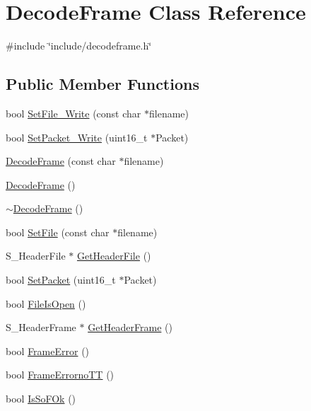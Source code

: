 \hypertarget{classDecodeFrame}{}\section{Decode\+Frame Class Reference}
\label{classDecodeFrame}


{\ttfamily \#include \char`\"{}include/decodeframe.\+h\char`\"{}}

\subsection*{Public Member Functions}
\begin{DoxyCompactItemize}
\item 
bool \hyperlink{classDecodeFrame_abe7a0f6d2223aa6a06da02745f2f624b}{Set\+File\+\_\+\+Write} (const char $\ast$filename)
\item 
bool \hyperlink{classDecodeFrame_a82966f11399d4b9987c0718d9c2713b4}{Set\+Packet\+\_\+\+Write} (uint16\+\_\+t $\ast$Packet)
\item 
\hyperlink{classDecodeFrame_ad55f7834381bfcdbe5796d11febfe3f0}{Decode\+Frame} (const char $\ast$filename)
\item 
\hyperlink{classDecodeFrame_ae6ae88ee29bcaff936e7c7b2380f96b4}{Decode\+Frame} ()
\item 
\hyperlink{classDecodeFrame_a150abde40a177b9b585c75d562516f2a}{$\sim$\+Decode\+Frame} ()
\item 
bool \hyperlink{classDecodeFrame_a61d74f8bd0886b27356a4431999049ae}{Set\+File} (const char $\ast$filename)
\item 
S\+\_\+\+Header\+File $\ast$ \hyperlink{classDecodeFrame_ad8de43342e31a5e31c2a8c57c576546f}{Get\+Header\+File} ()
\item 
bool \hyperlink{classDecodeFrame_a84aaba0024f0e2c959c83db47a4e6cd1}{Set\+Packet} (uint16\+\_\+t $\ast$Packet)
\item 
bool \hyperlink{classDecodeFrame_a5d8e060fc486a29d456973255c88e876}{File\+Is\+Open} ()
\item 
S\+\_\+\+Header\+Frame $\ast$ \hyperlink{classDecodeFrame_a0c3e4dd83dc4b935589628a17b0de765}{Get\+Header\+Frame} ()
\item 
bool \hyperlink{classDecodeFrame_a177c97af4a097447759fdbd28ef8d18a}{Frame\+Error} ()
\item 
bool \hyperlink{classDecodeFrame_a4c5721b8abf506ea36ceba56d07d930b}{Frame\+Errorno\+TT} ()
\item 
bool \hyperlink{classDecodeFrame_af2b5f1f869480dd72404b2fc3f1bac80}{Is\+So\+F\+Ok} ()

\end{DoxyCompactItemize}
